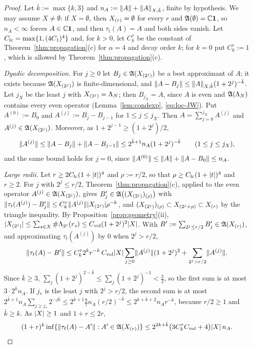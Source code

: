 \begin{proof}
Let $\bar k:=\max\{k,3\}$ and $n_A:=\lVert A\rVert+\lVert A\rVert_{X;\bar k}$, finite by hypothesis. We may assume $X\ne\emptyset$: if
$X=\emptyset$, then $X_{(r)}=\emptyset$ for every $r$ and $\mathfrak{A}(\emptyset)=\mathbb{C}\mathbf{1}$, so $n_A<\infty$ forces $A\in\mathbb{C}\mathbf{1}$,
and then $\tau_t(A)=A$ and both sides vanish. Let $C_{\rm lc}=\max\{1,(4C_1)^4\}$ and, for $k>0$, let $C^\tau_k$ be the constant
of Theorem~\ref{thm:propagation}(c) for $\alpha=4$ and decay order $k$; for $k=0$ put $C^\tau_0:=1$, which is allowed by
Theorem~\ref{thm:propagation}(c).

\emph{Dyadic decomposition.} For $j\ge0$ let $B_j\in\mathfrak{A}(X_{(2^j)})$ be a best approximant of $A$; it exists because
$\mathfrak{A}(X_{(2^j)})$ is finite-dimensional, and $\lVert A-B_j\rVert\le\lVert A\rVert_{X;\bar k}(1+2^j)^{-\bar k}$. Let $j_X$ be the least
$j$ with $X_{(2^j)}=\Lambda_N$; then $B_{j_X}=A$, since $A$ is even and $\mathfrak{A}(\Lambda_N)$ contains every even operator
(Lemma~\ref{lem:condexp}, \eqref{eq:loc-JW}). Put $A^{(0)}:=B_0$ and $A^{(j)}:=B_j-B_{j-1}$ for $1\le j\le j_X$. Then
$A=\sum_{j=0}^{j_X}A^{(j)}$ and $A^{(j)}\in\mathfrak{A}(X_{(2^j)})$. Moreover, as $1+2^{j-1}\ge(1+2^j)/2$,
\[
\lVert A^{(j)}\rVert\le\lVert A-B_j\rVert+\lVert A-B_{j-1}\rVert\le2^{\bar k+1}n_A(1+2^j)^{-\bar k}\qquad(1\le j\le j_X),
\]
and the same bound holds for $j=0$, since $\lVert A^{(0)}\rVert\le\lVert A\rVert+\lVert A-B_0\rVert\le n_A$.

\emph{Large radii.} Let $r\ge2C_{\rm lc}(1+\lvert t\rvert)^4$ and $\rho:=r/2$, so that $\rho\ge C_{\rm lc}(1+\lvert t\rvert)^4$ and $r\ge2$. For $j$
with $2^j\le r/2$, Theorem~\ref{thm:propagation}(c), applied to the even operator $A^{(j)}\in\mathfrak{A}(X_{(2^j)})$, gives
$B'_j\in\mathfrak{A}\bigl((X_{(2^j)})_{(\rho)}\bigr)$ with $\lVert\tau_t(A^{(j)})-B'_j\rVert\le C^\tau_k\lVert A^{(j)}\rVert\lvert X_{(2^j)}\rvert\rho^{-k}$,
and $(X_{(2^j)})_{(\rho)}\subset X_{(2^j+\rho)}\subset X_{(r)}$ by the triangle inequality. By
Proposition~\ref{prop:geometry}(ii), $\lvert X_{(2^j)}\rvert\le\sum_{s\in X}\#\Lambda_{2^j}(r_{s})\le C_{\mathrm{vol}}(1+2^j)^2\lvert X\rvert$. With
$B':=\sum_{2^j\le r/2}B'_j\in\mathfrak{A}(X_{(r)})$, and approximating $\tau_t(A^{(j)})$ by $0$ when $2^j>r/2$,
\[
\lVert\tau_t(A)-B'\rVert\le C^\tau_k2^kr^{-k}\,C_{\mathrm{vol}}\lvert X\rvert\sum_{j\ge0}\lVert A^{(j)}\rVert(1+2^j)^2+\sum_{2^j>r/2}\lVert A^{(j)}\rVert .
\]
Since $\bar k\ge3$, $\sum_j(1+2^j)^{2-\bar k}\le\sum_j(1+2^j)^{-1}<\frac32$, so the first sum is at most $3\cdot2^{\bar k}n_A$.
If $j_*$ is the least $j$ with $2^j>r/2$, the second sum is at most
$2^{\bar k+1}n_A\sum_{j\ge j_*}2^{-j\bar k}\le2^{\bar k+1}\tfrac87n_A(r/2)^{-\bar k}\le2^{k+\bar k+2}n_Ar^{-k}$, because
$r/2\ge1$ and $\bar k\ge k$. As $\lvert X\rvert\ge1$ and $1+r\le2r$,
\[
(1+r)^k\inf\{\lVert\tau_t(A)-A'\rVert:A'\in\mathfrak{A}(X_{(r)})\}\le2^{2k+\bar k}\bigl(3C^\tau_kC_{\mathrm{vol}}+4\bigr)\lvert X\rvert\,n_A .
\]


\end{proof}
